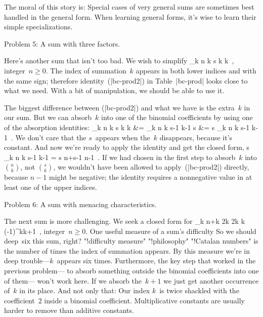 {The moral of this story is:
Special cases of very general sums
are sometimes best handled in the general form. When learning general
forms, it's wise to learn their simple specializations.

\subhead Problem 5: A sum with three factors.

Here's another sum that isn't too bad.
We wish to simplify
\begindisplay
 \sum_k {n \choose k} {s \choose k} k \,,
					\qquad\hbox{integer $n \geq 0$.}
\enddisplay
The index of summation~$k$ appears in both lower indices
and with the same sign;
therefore identity~\eq(|bc-prod2|) in Table~|bc-prod|
looks close to what we need. With a bit of manipulation,
we should be able to use it.

The biggest difference between \eq(|bc-prod2|) and what we have
is the extra~$k$ in our sum.
But we can absorb~$k$ into one of the binomial coefficients
by using one of the absorption identities:
\begindisplay {}
\sum_k {n \choose k} {s \choose k} k
	&= \sum_k {n \choose k} {s-1 \choose k-1} s \cr
	&= s \sum_k {n \choose k} {s-1 \choose k-1} \,.
\enddisplay
We don't care that the $s$~appears when the~$k$ disappears,
because it's constant.
And now we're ready to apply the identity and get the closed form,
\begindisplay
 s \sum_k {n \choose k} {s-1 \choose k-1}
	= s {n+s-1 \choose n-1} \,.
\enddisplay
If we had chosen in the first step to absorb~$k$
into $n \choose k$, not $s \choose k$,
we wouldn't have been allowed to apply~\eq(|bc-prod2|) directly,
because $n-1$ might be negative; the identity requires a nonnegative
value in at least one of the upper indices.

\subhead Problem 6: A sum with menacing characteristics.

The next sum is more challenging.
We seek a closed form for
\begindisplay
 \sum_{k} {n+k \choose 2k} {2k \choose k} {(-1)^k\over k+1} \,,
					\qquad\hbox{integer $n \geq 0$.}
\enddisplay
One useful measure of a sum's difficulty
\g So we should deep~six this sum, right?\g
"!difficulty measure" "!philosophy" "!Catalan numbers"
is the number of times the index of summation appears.
By this measure we're in deep trouble\dash---$k$~appears six times.
Furthermore, the key step that worked in the previous problem\dash---%
to absorb something outside the binomial coefficients into one of them\dash---%
won't work here. If we absorb the~$k+1$
we just get another occurrence of~$k$ in its place.
And not only that: Our index $k$~is twice shackled with the coefficient~$2$
inside a binomial coefficient.
Multiplicative constants are usually harder
to remove than additive constants.

}
